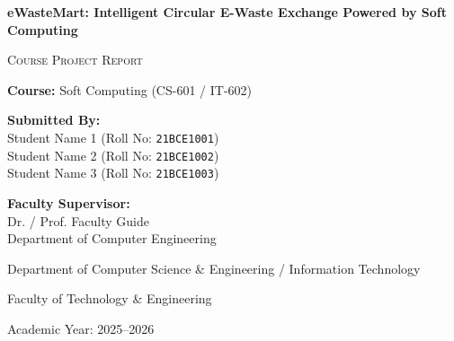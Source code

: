 \documentclass[12pt,a4paper]{article}
\begin{document}
\begin{titlepage}
    \centering
    \vspace*{1.5cm}
    
    {\Huge \bfseries eWasteMart: Intelligent Circular E-Waste Exchange Powered by Soft Computing\par}
    
    \vspace{0.8cm}
    {\Large \textsc{Course Project Report}\par}
    {\large \textbf{Course:} Soft Computing (CS-601 / IT-602)\par}
    
    \vspace{1.5cm}
    
    \begin{minipage}[t]{0.45\textwidth}
        \flushleft
        \textbf{Submitted By:}\\[0.2cm]
        Student Name 1 (Roll No: \texttt{21BCE1001})\\[0.1cm]
        Student Name 2 (Roll No: \texttt{21BCE1002})\\[0.1cm]
        Student Name 3 (Roll No: \texttt{21BCE1003})
    \end{minipage}
    \hfill
    \begin{minipage}[t]{0.45\textwidth}
        \flushright
        \textbf{Faculty Supervisor:}\\[0.2cm]
        Dr. / Prof. Faculty Guide\\[0.1cm]
        Department of Computer Engineering
    \end{minipage}
    
    \vfill
    
    {\large Department of Computer Science \& Engineering / Information Technology\par}
    {\large Faculty of Technology \& Engineering\par}
    {\large Academic Year: 2025--2026\par}
    
    \vspace{1cm}
\end{titlepage}

\newpage
\tableofcontents
\newpage

\end{document}
